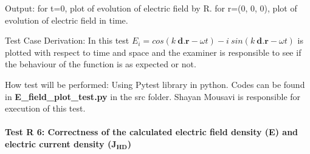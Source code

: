 \documentclass[12pt, titlepage]{article}
\begin{document}
\begin{enumerate}
Output: for t=0, plot of evolution of electric field by R. for r=(0, 0, 0), plot of evolution of electric field in time.

Test Case Derivation: In this test $E_i = cos(k\  \textbf{d.} \textbf{r} - \omega t) - i \ sin(k\  \textbf{d.} \textbf{r} - \omega t)$ is plotted with respect to time and space and the examiner is responsible to see if the behaviour of the function is as expected or not.   

How test will be performed: Using Pytest library in python. Codes can be found in \textbf{E\_field\_plot\_test.py } in the src folder. Shayan Mousavi is responsible for execution of this test. 
	
\end{enumerate}

\paragraph{Test R 6: Correctness of the calculated electric field density (E) and electric current density (J$_\textbf{{HD}}$)}
	
\end{document}
